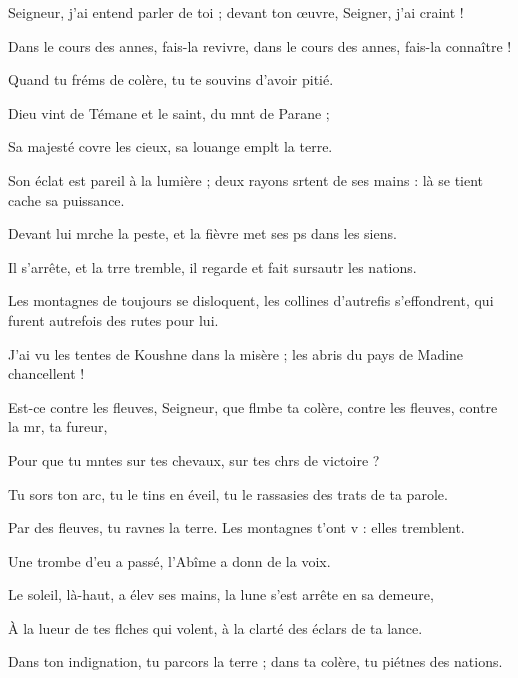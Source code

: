 \item Seigneur, j’ai entend parler de toi ;\psstar{} devant ton œuvre, Seigner, j’ai craint !
\item Dans le cours des annes, fais-la revivre,\psstar{} dans le cours des annes, fais-la connaître !
\item Quand tu fréms de colère,\psstar{} tu te souvins d’avoir pitié.
\item Dieu vint de Témane\psstar{} et le saint, du mnt de Parane ;
\item Sa majesté covre les cieux,\psstar{} sa louange emplt la terre.
\item Son éclat est pareil à la lumière ;\pscross{} deux rayons srtent de ses mains :\psstar{} là se tient cache sa puissance.
\item Devant lui mrche la peste,\psstar{} et la fièvre met ses ps dans les siens.
\item Il s’arrête, et la trre tremble,\psstar{} il regarde et fait sursautr les nations.
\item Les montagnes de toujours se disloquent,\pscross{} les collines d’autrefis s’effondrent,\psstar{} qui furent autrefois des rutes pour lui.
\item J’ai vu les tentes de Koushne dans la misère ;\psstar{} les abris du pays de Madine chancellent !
\item Est-ce contre les fleuves, Seigneur, que flmbe ta colère,\psstar{} contre les fleuves, contre la mr, ta fureur,
\item Pour que tu mntes sur tes chevaux,\psstar{} sur tes chrs de victoire ?
\item Tu sors ton arc, tu le tins en éveil,\psstar{} tu le rassasies des trats de ta parole. 
\item Par des fleuves, tu ravnes la terre.\psstar{} Les montagnes t’ont v : elles tremblent. 
\item Une trombe d’eu a passé, l’Abîme a donn de la voix. 
\item Le soleil, là-haut, a élev ses mains,\psstar{} la lune s’est arrête en sa demeure, 
\item À la lueur de tes flches qui volent,\psstar{} à la clarté des éclars de ta lance.
\item Dans ton indignation, tu parcors la terre ;\psstar{} dans ta colère, tu piétnes des nations.
